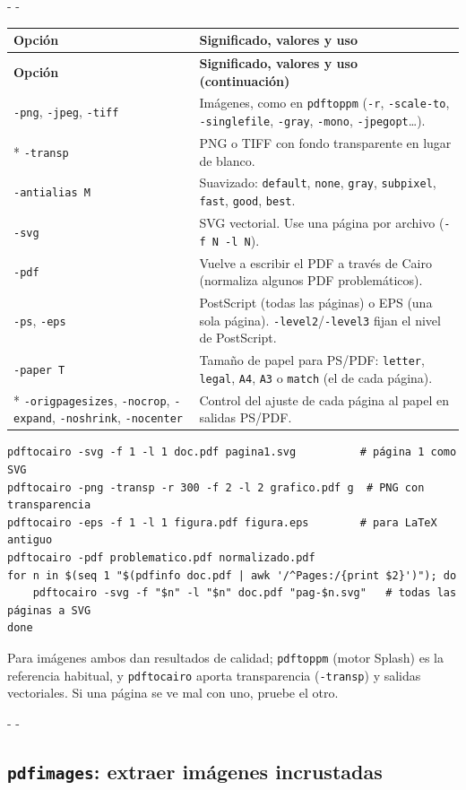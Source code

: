 \documentclass[11pt,a4paper]{article}
\makeatletter
\newcommand{\necesitaespacio}[1]{\par\penalty-100\begingroup
	\setlength{\dimen@}{#1}\dimen@ii\pagegoal\advance\dimen@ii-\pagetotal
	\ifdim\dimen@>\dimen@ii\ifdim\dimen@ii>\z@\vfil\fi\penalty-\@M\fi\endgroup}
\newenvironment{opciones}[1][Opción]{%
	\par\begingroup\small
	\begin{longtable}{L{4.25cm}L{11.2cm}}
		\toprule\rowcolor{tablacab}\cab{#1} & \cab{Significado, valores y uso} \\ \midrule
		\endfirsthead
		\toprule\rowcolor{tablacab}\cab{#1} & \cab{Significado, valores y uso (continuación)} \\ \midrule
		\endhead
		\bottomrule
		\endfoot}
	{\end{longtable}\endgroup}
\newcommand{\cmd}[1]{\texttt{\textcolor{colcmd}{#1}}}      %
\newcommand{\opt}[1]{\texttt{\textcolor{colopt}{#1}}}      %
\newcommand{\val}[1]{\texttt{#1}}                          %
\newcommand{\cab}[1]{\textbf{#1}}
\makeatother
\begin{document}
	\necesitaespacio{24\baselineskip}
	\begin{opciones}
		\opt{-png}, \opt{-jpeg}, \opt{-tiff} & Imágenes, como en \cmd{pdftoppm} (\opt{-r}, \opt{-scale-to}, \opt{-singlefile}, \opt{-gray}, \opt{-mono}, \opt{-jpegopt}\ldots).\\*
		\opt{-transp} & PNG o TIFF con fondo transparente en lugar de blanco.\\
		\opt{-antialias M} & Suavizado: \val{default}, \val{none}, \val{gray}, \val{subpixel}, \val{fast}, \val{good}, \val{best}.\\
		\opt{-svg} & SVG vectorial. Use una página por archivo (\opt{-f N -l N}).\\
		\opt{-pdf} & Vuelve a escribir el PDF a través de Cairo (normaliza algunos PDF problemáticos).\\
		\opt{-ps}, \opt{-eps} & PostScript (todas las páginas) o EPS (una sola página). \opt{-level2}/\opt{-level3} fijan el nivel de PostScript.\\
		\opt{-paper T} & Tamaño de papel para PS/PDF: \val{letter}, \val{legal}, \val{A4}, \val{A3} o \val{match} (el de cada página).\\*
		\opt{-origpagesizes}, \opt{-nocrop}, \opt{-expand}, \opt{-noshrink}, \opt{-nocenter} & Control del ajuste de cada página al papel en salidas PS/PDF.\\
	\end{opciones}
	
	\begin{lstlisting}
pdftocairo -svg -f 1 -l 1 doc.pdf pagina1.svg          # página 1 como SVG
pdftocairo -png -transp -r 300 -f 2 -l 2 grafico.pdf g  # PNG con transparencia
pdftocairo -eps -f 1 -l 1 figura.pdf figura.eps        # para LaTeX antiguo
pdftocairo -pdf problematico.pdf normalizado.pdf
for n in $(seq 1 "$(pdfinfo doc.pdf | awk '/^Pages:/{print $2}')"); do
    pdftocairo -svg -f "$n" -l "$n" doc.pdf "pag-$n.svg"   # todas las páginas a SVG
done
\end{lstlisting}
	
	\begin{nota}
		Para imágenes ambos dan resultados de calidad; \cmd{pdftoppm} (motor Splash) es la referencia habitual, y \cmd{pdftocairo} aporta transparencia (\opt{-transp}) y salidas vectoriales. Si una página se ve mal con uno, pruebe el otro.
	\end{nota}
	
	\necesitaespacio{8\baselineskip}
	\subsection{\texttt{pdfimages}: extraer imágenes incrustadas}\label{sec:pdfimages}
	
\end{document}
